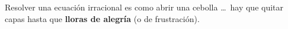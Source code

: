 \begin{capitulobox}
Resolver una ecuación irracional es como abrir una cebolla \ldots\, hay que quitar capas hasta 
que \textbf{lloras de alegría} (o de frustración).
\end{capitulobox}


